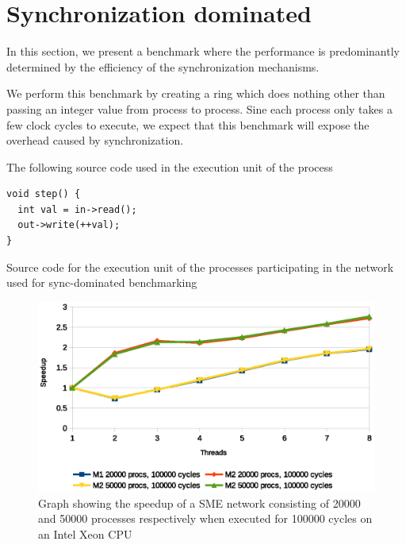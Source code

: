 \section{Synchronization dominated}
In this section, we present a benchmark where the performance is
predominantly determined by the efficiency of the synchronization
mechanisms.

We perform this benchmark by creating a ring which does nothing other
than passing an integer value from process to process. Sine each
process only takes a few clock cycles to execute, we expect that this
benchmark will expose the overhead caused by synchronization.

The following source code used in the execution unit of the process
\begin{listing}
\begin{verbatim}
void step() {
  int val = in->read();
  out->write(++val);
}
\end{verbatim}

\caption{Source code for the execution unit of the processes
  participating in the network used for sync-dominated benchmarking}
\end{listing}

\begin{figure}
\centering
\includegraphics[width=\textwidth]{graphs/intel-sync}
\caption[Benchmark graph]{Graph showing the speedup of a SME network
  consisting of 20000 and 50000 processes respectively when executed
  for 100000 cycles on an Intel Xeon CPU}
\label{fig:intel-sync}
\end{figure}

